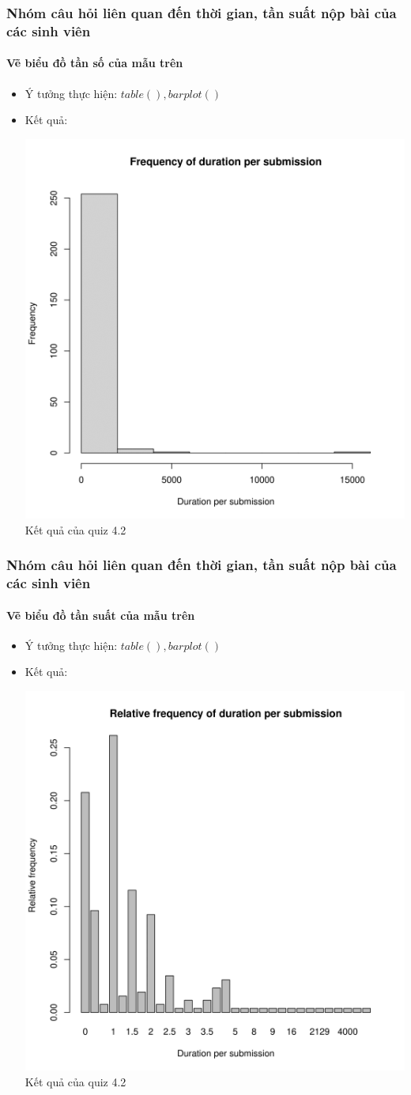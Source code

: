 \documentclass[english,10pt,table]{beamer}
\begin{document}
\frame
{
\frametitle{Nhóm câu hỏi liên quan đến thời gian, tần suất nộp bài của các sinh viên}
\framesubtitle{Vẽ biểu đồ tần số của mẫu trên}
\begin{itemize}
    \item Ý tưởng thực hiện: $table(), barplot()$
    \item Kết quả:\\
    \begin{center}
        \includegraphics[width = 6 cm]{Images/img4-4-4.png}\\
        Kết quả của quiz 4.2
    \end{center}
\end{itemize}
}

\frame
{
\frametitle{Nhóm câu hỏi liên quan đến thời gian, tần suất nộp bài của các sinh viên}
\framesubtitle{Vẽ biểu đồ tần suất của mẫu trên}
\begin{itemize}
    \item Ý tưởng thực hiện: $table(), barplot()$
    \item Kết quả:\\
    \begin{center}
        \includegraphics[width = 6 cm]{Images/img4-5-4.png}\\
        Kết quả của quiz 4.2
    \end{center}
\end{itemize}
}
\end{document}
